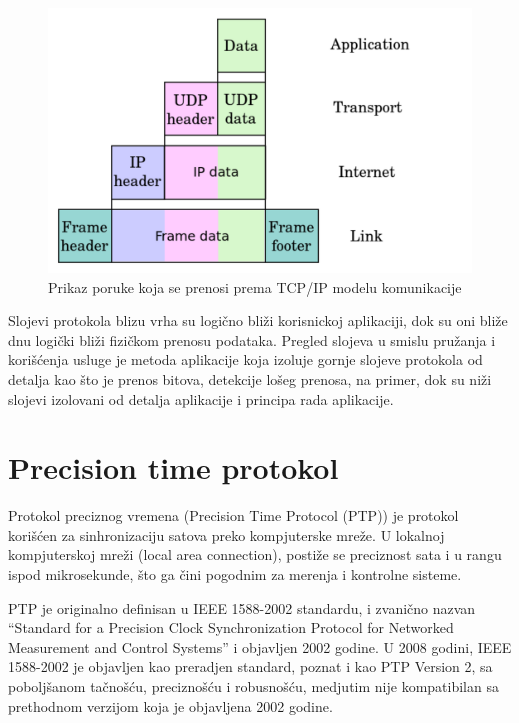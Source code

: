 \documentclass[a4paper,12pt, master]{etf}
\begin{document}
	\begin{figure}[htb]
			\centering
			\includegraphics[scale=.4]{../pic/tcpip_data.png}
			\caption{Prikaz poruke koja se prenosi prema TCP/IP modelu
					komunikacije}
			\label{fig:tcpip_data}
	\end{figure}

	Slojevi protokola blizu vrha su logi\v{c}no bli\v{z}i korisnickoj
	aplikaciji, dok su oni bli\v{z}e dnu logi\v{c}ki bli\v{z}i fizi\v{c}kom
	prenosu podataka. Pregled slojeva u smislu pru\v{z}anja i kori\v{s}\'{c}enja
	usluge je metoda aplikacije koja izoluje gornje slojeve protokola od
	detalja kao \v{s}to je prenos bitova, detekcije lo\v{s}eg prenosa, na
	primer, dok su ni\v{z}i slojevi izolovani od detalja aplikacije i principa
	rada aplikacije.

	\section{Precision time protokol}

    Protokol preciznog vremena (Precision Time Protocol (PTP)) je protokol
	kori\v{s}\'{c}en za sinhronizaciju satova preko kompjuterske mre\v{z}e. U
	lokalnoj kompjuterskoj mre\v{z}i (local area connection), posti\v{z}e se
	preciznost sata i u rangu ispod mikrosekunde, \v{s}to ga \v{c}ini pogodnim
	za merenja i kontrolne sisteme.

	PTP je originalno definisan u IEEE 1588-2002 standardu, i zvani\v{c}no
	nazvan ``Standard for a Precision Clock Synchronization Protocol for
	Networked Measurement and Control Systems'' i objavljen 2002 godine. U 2008
	godini, IEEE 1588-2002 je objavljen kao preradjen standard, poznat i kao
	PTP Version 2, sa pobolj\v{s}anom ta\v{c}no\v{s}\'{c}u, precizno\v{s}\'{c}u
	i robusno\v{s}\'{c}u, medjutim nije kompatibilan sa prethodnom verzijom
	koja je objavljena 2002 godine.
\end{document}
